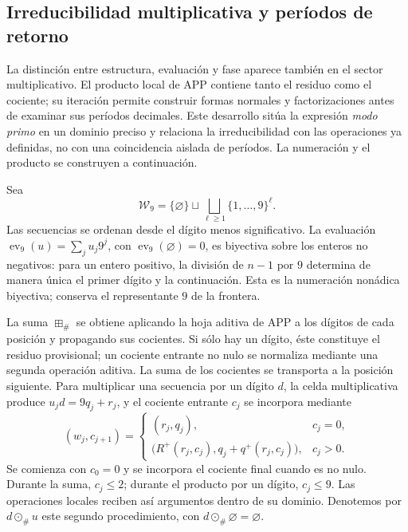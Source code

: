 \subsection{Irreducibilidad multiplicativa y períodos de retorno}
\label{primos-retornos}

La distinción entre estructura, evaluación y fase aparece también en el
sector multiplicativo. El producto local de APP contiene tanto el residuo
como el cociente; su iteración permite construir formas normales y
factorizaciones antes de examinar sus períodos decimales. Este desarrollo
sitúa la expresión \emph{modo primo} en un dominio preciso y relaciona la
irreducibilidad con las operaciones ya definidas, no con una coincidencia
aislada de períodos. La numeración y el producto se construyen a continuación.

Sea
\[
 \mathcal W_9=\{\varnothing\}\sqcup
 \bigsqcup_{\ell\geq1}\{1,\ldots,9\}^{\ell}.
\]
Las secuencias se ordenan desde el dígito menos significativo. La evaluación
\(\operatorname{ev}_9(u)=\sum_j u_j9^j\), con
\(\operatorname{ev}_9(\varnothing)=0\), es biyectiva sobre los enteros no
negativos: para un entero positivo, la división de \(n-1\) por \(9\)
determina de manera única el primer dígito y la continuación. Esta es la
numeración nonádica biyectiva; conserva el representante \(9\) de la
frontera.

La suma \(\boxplus_\#\) se obtiene aplicando la hoja aditiva de APP a los
dígitos de cada posición y propagando sus cocientes. Si sólo hay un dígito,
éste constituye el residuo provisional; un cociente entrante no nulo se
normaliza mediante una segunda operación aditiva. La suma de los
cocientes se transporta a la posición siguiente. Para multiplicar una
secuencia por un dígito \(d\), la celda multiplicativa produce
\(u_jd=9q_j+r_j\), y el cociente entrante \(c_j\) se incorpora mediante
\[
 (w_j,c_{j+1})=
 \begin{cases}
 (r_j,q_j),&c_j=0,\\
 \bigl(R^+(r_j,c_j),q_j+q^+(r_j,c_j)\bigr),&c_j>0.
 \end{cases}
\]
Se comienza con \(c_0=0\) y se incorpora el cociente final cuando es no
nulo. Durante la suma, \(c_j\leq2\); durante el producto por un dígito,
\(c_j\leq9\). Las operaciones locales reciben así argumentos dentro
de su dominio. Denotemos por \(d\odot_\#u\) este segundo procedimiento,
con \(d\odot_\#\varnothing=\varnothing\).

